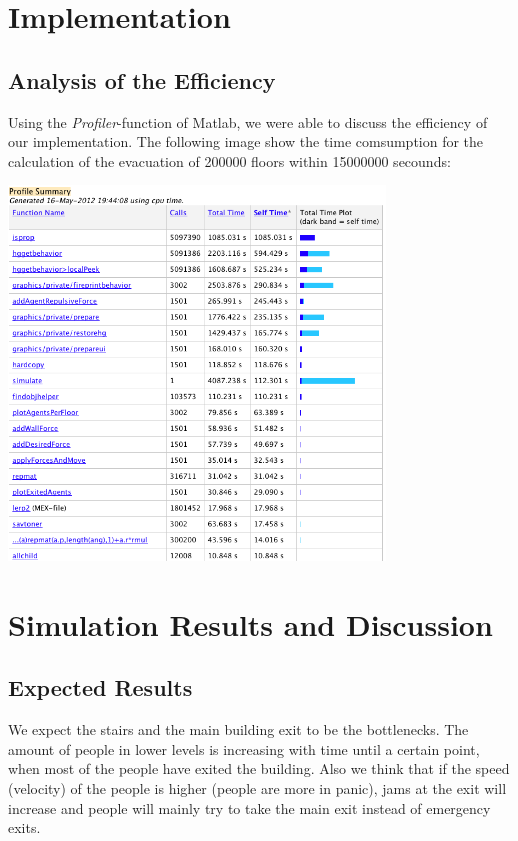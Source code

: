 \documentclass[11pt]{article}
\begin{document}
\section{Implementation}


\subsection{Analysis of the Efficiency}

Using the \textit{Profiler}-function of Matlab, we were able to discuss the efficiency of our implementation. The following image show the time comsumption for the calculation of the evacuation of 200000 floors within 15000000 secounds: %

\medskip

\begin{center}
	\includegraphics[width=100mm]{./images/profiler.png}
\end{center}

\section{Simulation Results and Discussion}

\subsection{Expected Results}

We expect the stairs and the main building exit to be the bottlenecks. The amount of people in lower levels is increasing with time until a certain point, when most of the people have exited the building. Also we think that if the speed (velocity) of the people is higher (people are more in panic), jams at the exit will increase and people will mainly try to take the main exit instead of emergency exits.
\end{document}

